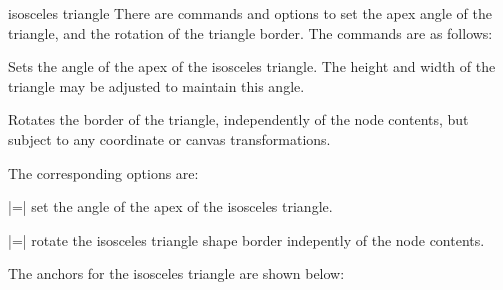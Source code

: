 \begin{shape}{isosceles triangle}
	There are \pgfname{} commands and \tikzname{} options to set the 
  	apex angle of the triangle, and the rotation of the triangle border.
  	The \pgfname{} commands are as follows:
    
  \begin{command}{\pgfsettriangleapexangle{}}
    Sets the angle of the apex of the isosceles triangle. The height
    and width of the triangle may be adjusted to maintain this
    angle.
  \end{command}
  
  \begin{command}{\pgfsettrianglerotate{}}
    Rotates the border of the triangle, independently of the node contents,
    but subject to any coordinate or canvas transformations.
  \end{command}
  
  The corresponding \tikzname{} options are:
  
  \begin{itemize}
    |=|
    set the angle of the apex of the isosceles triangle.
    
    |=|
    rotate the isosceles triangle shape border indepently of the node contents.
    
  \end{itemize}
  
   The anchors for the isosceles triangle are shown below:

\begin{codeexample}[]
\Huge
{}
\end{codeexample}

\end{shape}

